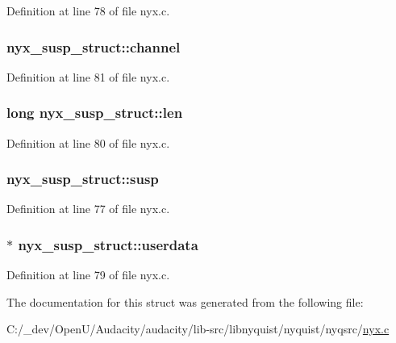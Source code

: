 Definition at line 78 of file nyx.\+c.

\subsubsection[{\texorpdfstring{channel}{channel}}]{ nyx\+\_\+susp\+\_\+struct\+::channel}\hypertarget{structnyx__susp__struct_a20d9b59231ed82e68ca4afe0b2d6700c}{}\label{structnyx__susp__struct_a20d9b59231ed82e68ca4afe0b2d6700c}


Definition at line 81 of file nyx.\+c.

\subsubsection[{\texorpdfstring{len}{len}}]{\setlength{\rightskip}{0pt plus 5cm}long nyx\+\_\+susp\+\_\+struct\+::len}\hypertarget{structnyx__susp__struct_aa3e884a8cc118e30638119472dd18e83}{}\label{structnyx__susp__struct_aa3e884a8cc118e30638119472dd18e83}


Definition at line 80 of file nyx.\+c.

\subsubsection[{\texorpdfstring{susp}{susp}}]{ nyx\+\_\+susp\+\_\+struct\+::susp}\hypertarget{structnyx__susp__struct_a8a4e09c7e609ac7f9b174c0855ce1834}{}\label{structnyx__susp__struct_a8a4e09c7e609ac7f9b174c0855ce1834}


Definition at line 77 of file nyx.\+c.

\subsubsection[{\texorpdfstring{userdata}{userdata}}]{ $\ast$ nyx\+\_\+susp\+\_\+struct\+::userdata}\hypertarget{structnyx__susp__struct_ae57b1688bbc6968f57cea4112e8b01f3}{}\label{structnyx__susp__struct_ae57b1688bbc6968f57cea4112e8b01f3}


Definition at line 79 of file nyx.\+c.



The documentation for this struct was generated from the following file\+:\begin{DoxyCompactItemize}
\item 
C\+:/\+\_\+dev/\+Open\+U/\+Audacity/audacity/lib-\/src/libnyquist/nyquist/nyqsrc/\hyperlink{nyquist_2nyqsrc_2nyx_8c}{nyx.\+c}\end{DoxyCompactItemize}
